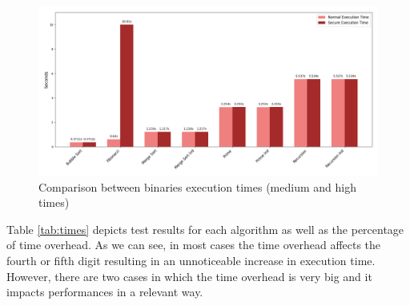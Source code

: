 \begin{figure}[htbp]
  \centering
  \includegraphics[width=\linewidth]{images/high_times.png}
  \caption{Comparison between binaries execution times (medium and high times)}
  \label{fig:hightime}
\end{figure}

Table \ref{tab:times} depicts test results for each algorithm as well as the
percentage of time overhead. As we can see, in most cases the time overhead
affects the fourth or fifth digit resulting in an unnoticeable increase in
execution time. However, there are two cases in which the time overhead is very
big and it impacts performances in a relevant way.


